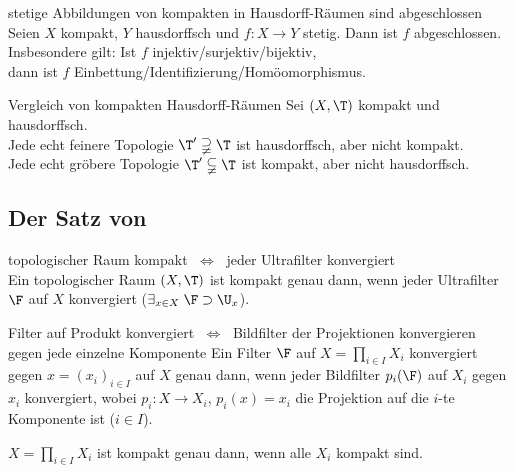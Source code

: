 \begin{Satz}{stetige Abbildungen von kompakten in Hausdorff-Räumen sind
             abgeschlossen} \\
    Seien $X$ kompakt, $Y$ hausdorffsch und $f\colon X \rightarrow Y$ stetig.
    Dann ist $f$ abgeschlossen. \\
    Insbesondere gilt:
    Ist $f$ injektiv/surjektiv/bijektiv, \\
    dann ist $f$ Einbettung/Identifizierung/Homöomorphismus.
\end{Satz}

\begin{Satz}{Vergleich von kompakten Hausdorff-Räumen}
    Sei $(X, \T)$ kompakt und hausdorffsch. \\
    Jede echt feinere Topologie $\T' \supsetneqq \T$ ist hausdorffsch,
    aber nicht kompakt. \\
    Jede echt gröbere Topologie $\T' \subsetneqq \T$ ist kompakt,
    aber nicht hausdorffsch.
\end{Satz}

\subsection{%
    Der Satz von %
}

\begin{Satz}{topologischer Raum kompakt $\;\Leftrightarrow\;$
             jeder Ultrafilter konvergiert} \\
    Ein topologischer Raum $(X, \T)$ ist kompakt genau dann, wenn
    jeder Ultrafilter $\F$ auf $X$ konvergiert
    ($\exists_{x \in X}\; \F \supset \U_x$).
\end{Satz}

\begin{Lemma}{Filter auf Produkt konvergiert $\;\Leftrightarrow\;$
              Bildfilter der Projektionen konvergieren gegen
              jede einzelne Komponente}
    Ein Filter $\F$ auf $X = \prod_{i \in I} X_i$ konvergiert gegen
    $x = (x_i)_{i \in I}$ auf $X$ genau dann, wenn jeder
    Bildfilter $p_i(\F)$ auf $X_i$ gegen $x_i$ konvergiert, wobei
    $p_i\colon X \rightarrow X_i$, $p_i(x) = x_i$
    die Projektion auf die $i$-te Komponente ist ($i \in I$).
\end{Lemma}

\begin{Satz}{}
    $X = \prod_{i \in I} X_i$ ist kompakt genau dann, wenn alle $X_i$ kompakt
    sind.
\end{Satz}

